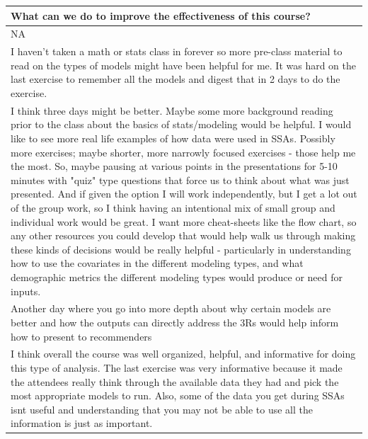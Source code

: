 \documentclass[]{article}
\begin{document}
\begin{table}[H]
\centering
\begin{tabular}{l}
\hline
What can we do to improve the effectiveness of this course?\\
\hline
NA\\
\hline
I haven't taken a math or stats class in forever so more pre-class material to read on the types of models might have been helpful for me.  It was hard on the last exercise to remember all the models and digest that in 2 days to do the exercise.\\
\hline
I think three days might be better.  Maybe some more background reading prior to the class about the basics of stats/modeling would be helpful. I would like to see more real life examples of how data were used in SSAs.  Possibly more exercises; maybe shorter, more narrowly focused exercises - those help me the most.  So, maybe pausing at various points in the presentations for 5-10 minutes with "quiz" type questions that force us to think about what was just presented.  And if given the option I will work independently, but I get a lot out of the group work, so I think having an intentional mix of small group and individual work would be great.  I want more cheat-sheets like the flow chart, so any other resources you could develop that would help walk us through making these kinds of decisions would be really helpful - particularly in understanding how to use the covariates in the different modeling types, and what demographic metrics the different modeling types would produce or need for inputs.\\
\hline
Another day where you go into more depth about why certain models are better and how the outputs can directly address the 3Rs would help inform how to present to recommenders\\
\hline
I think overall the course was well organized, helpful, and informative for doing this type of analysis. The last exercise was very informative because it made the attendees really think through the available data they had and pick the most appropriate models to run. Also, some of the data you get during SSAs isnt useful and understanding that you may not be able to use all the information is just as important. 


\end{tabular}
\end{table}
\end{document}
